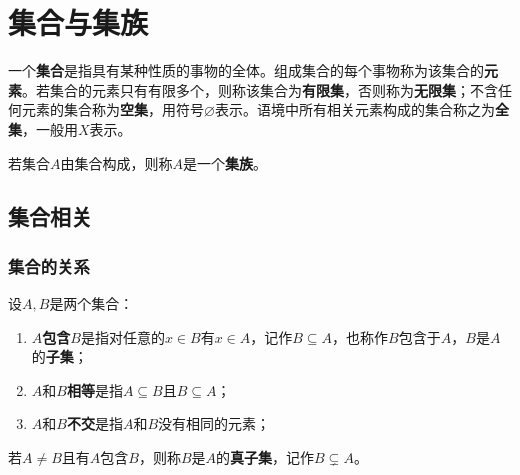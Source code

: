 \section{集合与集族}
\begin{definition}
	一个\textbf{集合}是指具有某种性质的事物的全体。组成集合的每个事物称为该集合的\textbf{元素}。若集合的元素只有有限多个，则称该集合为\textbf{有限集}，否则称为\textbf{无限集}；不含任何元素的集合称为\textbf{空集}，用符号$\varnothing$表示。语境中所有相关元素构成的集合称之为\textbf{全集}，一般用$X$表示。
\end{definition}
\begin{definition}
	若集合$A$由集合构成，则称$A$是一个\textbf{集族}。
\end{definition}

\subsection{集合相关}
\subsubsection{集合的关系}
\begin{definition}
	设$A,B$是两个集合：
	\begin{enumerate}
		\item $A$\textbf{包含}$B$是指对任意的$x\in B$有$x\in A$，记作$B\subseteq A$，也称作$B$包含于$A$，$B$是$A$的\textbf{子集}；
		\item $A$和$B$\textbf{相等}是指$A\subseteq B$且$B\subseteq A$；
		\item $A$和$B$\textbf{不交}是指$A$和$B$没有相同的元素；
	\end{enumerate}
	若$A\ne B$且有$A$包含$B$，则称$B$是$A$的\textbf{真子集}，记作$B\subsetneq A$。
\end{definition}
